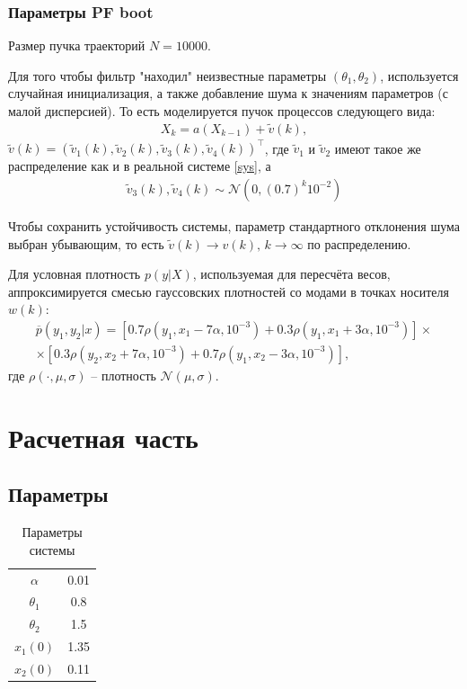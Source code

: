 \documentclass[a4paper,12pt]{article}
\begin{document}
\subsubsection{Параметры PF boot}
Размер пучка траекторий $N = 10000$.

Для того чтобы фильтр "находил" неизвестные параметры $(\theta_1, \theta_2)$, используется случайная инициализация, а также добавление шума к значениям параметров (с малой дисперсией). То есть моделируется пучок процессов следующего вида:
\begin{align*}
    X_k = a(X_{k-1}) + \tilde{v}(k),
\end{align*}
$\tilde{v}(k) = (\tilde{v}_1(k), \tilde{v}_2(k), \tilde{v}_3(k), \tilde{v}_4(k))^\top$,
где $\tilde{v}_1$ и $\tilde{v}_2$ имеют такое же распределение как и в реальной системе \ref{sys}, а 
\begin{gather*}
    \tilde{v}_3(k), \tilde{v}_4(k) \sim \mathcal{N}(0, (0.7)^k10^{-2})
\end{gather*}

Чтобы сохранить устойчивость системы, параметр стандартного отклонения шума выбран убывающим, то есть $\tilde{v}(k) \to v(k),\, k \to \infty$ по распределению.

Для условная плотность $p(y|X)$, используемая для пересчёта весов, аппроксимируется смесью гауссовских плотностей со модами в точках носителя $w(k)$:
\begin{multline*}
    \overline{p}(y_1, y_2|x) = \left[ 0.7 \rho(y_1, x_1-7\alpha, 10^{-3}) + 0.3 \rho(y_1, x_1+3\alpha, 10^{-3}) \right] \times \\
    \times \left[ 0.3 \rho(y_2, x_2+7\alpha, 10^{-3}) + 0.7 \rho(y_1, x_2-3\alpha, 10^{-3}) \right],
\end{multline*}
где $\rho(\cdot, \mu, \sigma)$ -- плотность $\mathcal{N}(\mu, \sigma)$.

\section{Расчетная часть}

\subsection{Параметры}

\begin{table}
    \centering
    \begin{tabular}{c|c}
        $\alpha$ & 0.01 \\
        $\theta_1$ & 0.8 \\
        $\theta_2$ & 1.5 \\
        $x_1(0)$ & 1.35 \\
        $x_2(0)$ & 0.11
    \end{tabular}
    \caption{Параметры системы}
    \label{tab:params}
\end{table}
\end{document}
